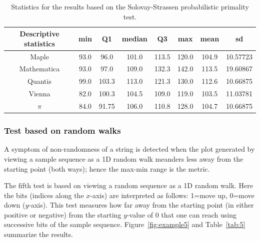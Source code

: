 \documentclass[%
 preprint,
 showpacs,
 showkeys,
 preprintnumbers,
 amsmath,amssymb,
 aps,
 prl,
  longbibliography,
 ]{revtex4-1}
\begin{document}
\begin{table}
   \caption{Statistics for the results based on the
Solovay-Strassen probabilistic primality test.}\label{tab:4}
\begin{center}
\begin{tabular}
[c]{ c c c c c c c c }%
\hline\hline
Descriptive statistics & min & Q1 & median & Q3 & max & mean & sd\\\hline
Maple & 93.0 & 96.0 & 101.0 & 113.5 & 120.0 & 104.9 & 10.57723\\
Mathematica & 93.0 & 97.0 & 109.0 & 132.3 & 142.0 & 113.5 & 19.60867\\
Quantis & 99.0 & 103.3 & 113.0 & 121.3 & 130.0 & 112.6 & 10.66875\\
Vienna & 82.0 & 100.3 & 104.5 & 109.0 & 119.0 & 103.5 & 11.03781\\
$\pi$ & 84.0 & 91.75 & 106.0 & 110.8 & 128.0 & 104.7 & 10.66875\\\hline  \hline
\end{tabular}
\end{center}
\end{table}


\subsubsection{Test based on random walks}



A symptom of non-randomness of a string is detected when the plot generated by viewing a sample sequence as
a 1D random walk meanders less  away
from the starting point (both ways); hence the max-min range is the metric.


The fifth test
is based on viewing a  random
sequence as a 1D random walk.  Here the bits (indices along the $x$-axis) are
interpreted as follows: 1=move up, 0=move down ($y$-axis).
This test measures  how far away from the starting point (in either positive
or negative) from the starting $y$-value of 0 that one can reach using
successive bits of the sample sequence.
Figure~\ref{fig:example5} and Table~\ref{tab:5} summarize the results.
\end{document}
